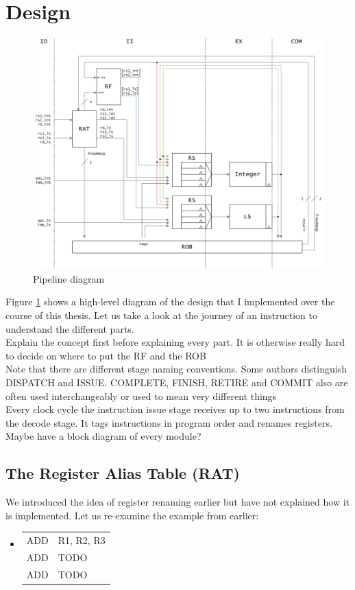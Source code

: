 \documentclass[12pt,a4paper]{article}
\newenvironment {assembly}{\begingroup \ttfamily \color{Orange} \begin{itemize} \item[]}{\end{itemize}\endgroup}
\newcommand{\note}{\textcolor{WildStrawberry}}
\begin{document}
\newpage
\section{Design}

\begin{figure}[!h]
	\centering
	\includegraphics[width = \textwidth]{Source/pipeline.png}
	\caption{Pipeline diagram}
	\label{pipeline}
\end{figure}
Figure \ref{pipeline} shows a high-level diagram of the design that I implemented over the course of this thesis. Let us take a look at the journey of an instruction to understand the different parts.\\
\note{Explain the concept first before explaining every part. It is otherwise really hard to decide on where to put the RF and the ROB}\\
\note{Note that there are different stage naming conventions. Some authors distinguish DISPATCH and ISSUE. COMPLETE, FINISH, RETIRE and COMMIT also are often used interchangeably or used to mean very different things}\\

Every clock cycle the instruction issue stage receives up to two instructions from the decode stage. It tags instructions in program order and renames registers.\\

\note{Maybe have a block diagram of every module?}\\

\subsection{The Register Alias Table (RAT)}
We introduced the idea of register renaming earlier but have not explained how it is implemented. Let us re-examine the example from earlier:
\begin{assembly}
	\begin{tabularx} {\textwidth} {l X}
		ADD & R1, R2, R3\\
		ADD & TODO\\
		ADD & TODO\\
	\end{tabularx}
\end{assembly}
\end{document}
